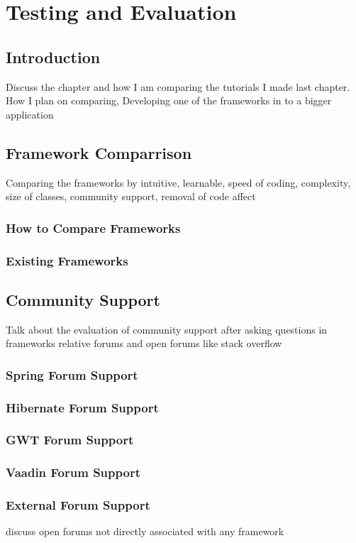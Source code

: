 \chapter*{Testing and Evaluation}
\section{Introduction}
Discuss the chapter and how I am comparing the tutorials I made last chapter.
How I plan on comparing, Developing one of the frameworks in to a bigger application
\section{Framework Comparrison}
Comparing the frameworks by intuitive, learnable, speed of coding, complexity,
size of classes, community support, removal of code affect
\subsection{How to Compare Frameworks}
\subsection{Existing Frameworks}

\section{Community Support}
Talk about the evaluation of community support after asking questions
in frameworks relative forums and open forums like stack overflow
\subsection{Spring Forum Support}
\subsection{Hibernate Forum Support}
\subsection{GWT Forum Support}
\subsection{Vaadin Forum Support}
\subsection{External Forum Support}
discuss open forums not directly associated with any framework

